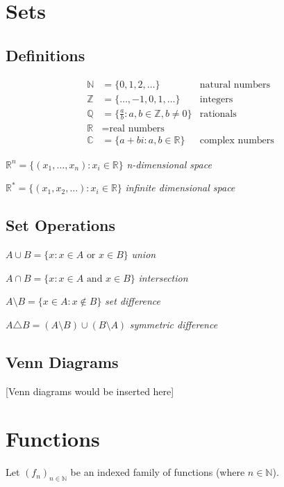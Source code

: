 \documentclass[12pt,a4paper]{article}
\begin{document}
\section{Sets}

\subsection{Definitions}

\begin{align*}
\mathbb{N} &= \{0, 1, 2, \ldots\} &\text{natural numbers} \\
\mathbb{Z} &= \{\ldots, -1, 0, 1, \ldots\} &\text{integers} \\
\mathbb{Q} &= \{\frac{a}{b} : a, b \in \mathbb{Z}, b \neq 0\} &\text{rationals} \\
\mathbb{R} &= \text{real numbers} \\
\mathbb{C} &= \{a + bi : a, b \in \mathbb{R}\} &\text{complex numbers}
\end{align*}

$\mathbb{R}^n = \{(x_1, \ldots, x_n) : x_i \in \mathbb{R}\}$ \textit{n-dimensional space}

$\mathbb{R}^* = \{(x_1, x_2, \ldots) : x_i \in \mathbb{R}\}$ \textit{infinite dimensional space}

\subsection{Set Operations}

$A \cup B = \{x : x \in A \text{ or } x \in B\}$ \textit{union}

$A \cap B = \{x : x \in A \text{ and } x \in B\}$ \textit{intersection}

$A \setminus B = \{x \in A : x \notin B\}$ \textit{set difference}

$A \triangle B = (A \setminus B) \cup (B \setminus A)$ \textit{symmetric difference}

\subsection{Venn Diagrams}

[Venn diagrams would be inserted here]

\section{Functions}

Let $(f_n)_{n \in \mathbb{N}}$ be an indexed family of functions (where $n \in \mathbb{N}$).
\end{document}
